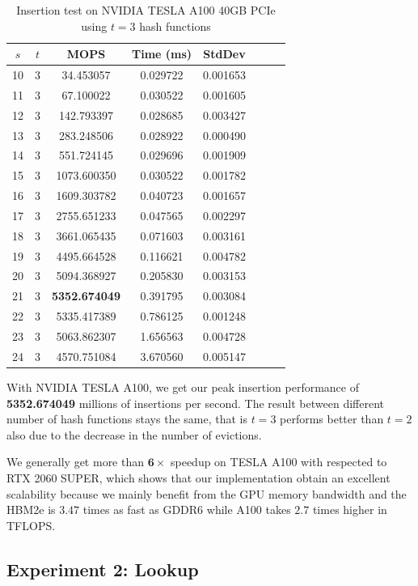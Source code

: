 \documentclass[10pt,twocolumn,letterpaper]{article}
\begin{document}
\begin{table}[h]
    \centering
   \begin{tabular}{@{}c|ccccccc@{}}
\toprule
$s$  & $t$ & MOPS    & Time (ms)& StdDev  \\ \midrule
10 & 3 & 34.453057 & 0.029722 & 0.001653 \\
11 & 3 & 67.100022 & 0.030522 & 0.001605 \\
12 & 3 & 142.793397 & 0.028685 & 0.003427 \\
13 & 3 & 283.248506 & 0.028922 & 0.000490 \\
14 & 3 & 551.724145 & 0.029696 & 0.001909 \\
15 & 3 & 1073.600350 & 0.030522 & 0.001782 \\
16 & 3 & 1609.303782 & 0.040723 & 0.001657 \\
17 & 3 & 2755.651233 & 0.047565 & 0.002297 \\
18 & 3 & 3661.065435 & 0.071603 & 0.003161 \\
19 & 3 & 4495.664528 & 0.116621 & 0.004782 \\
20 & 3 & 5094.368927 & 0.205830 & 0.003153 \\
21 & 3 & \textbf{5352.674049} & 0.391795 & 0.003084 \\
22 & 3 & 5335.417389 & 0.786125 & 0.001248 \\
23 & 3 & 5063.862307 & 1.656563 & 0.004728 \\
24 & 3 & 4570.751084 & 3.670560 & 0.005147 \\
\bottomrule
\end{tabular}
    \caption{Insertion test on NVIDIA TESLA A100 40GB PCIe using $t = 3$ hash functions}
    \label{tab:insert_3_A100}
\end{table}

With NVIDIA TESLA A100, we get our peak insertion performance of \textbf{5352.674049} millions of insertions per second. The result between different number of hash functions stays the same, that is $t = 3$ performs better than $t = 2$ also due to the decrease in the number of evictions.

We generally get more than $\mathbf{6\times}$ speedup on TESLA A100 with respected to RTX 2060 SUPER, which shows that our implementation obtain an excellent scalability because we mainly benefit from the GPU memory bandwidth and the HBM2e is $3.47$ times as fast as GDDR6 while A100 takes $2.7$ times higher in TFLOPS.


\subsection{Experiment 2: Lookup}
\end{document}
